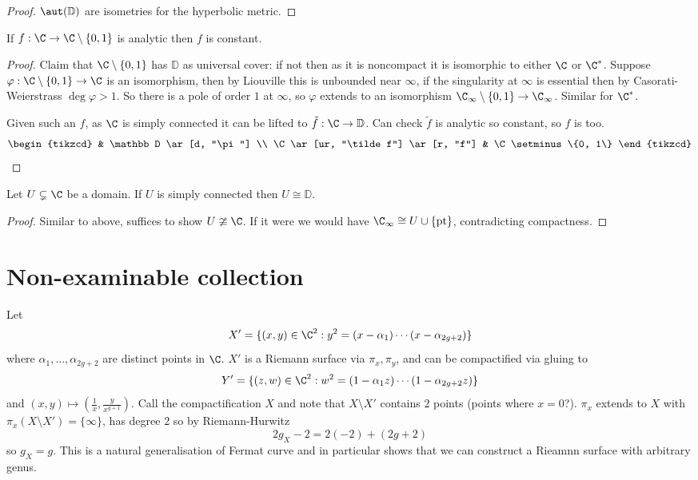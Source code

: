 \documentclass[a4paper]{article}
\begin{document}
\begin{proof}
  \(\aut(\mathbb D)\) are isometries for the hyperbolic metric.
\end{proof}

\begin{corollary}[Picard]
  If \(f: \C \to \C \setminus \{0, 1\}\) is analytic then \(f\) is constant.
\end{corollary}

\begin{proof}
  Claim that \(\C \setminus \{0, 1\}\) has \(\mathbb D\) as universal cover: if not then as it is noncompact it is isomorphic to either \(\C\) or \(\C^*\). Suppose \(\varphi: \C \setminus \{0, 1\} \to \C\) is an isomorphism, then by Liouville this is unbounded near \(\infty\), if the singularity at \(\infty\) is essential then by Casorati-Weierstrass \(\deg \varphi > 1\). So there is a pole of order \(1\) at \(\infty\), so \(\varphi\) extends to an isomorphism \(\C_\infty \setminus \{0, 1\} \to \C_\infty\). Similar for \(\C^*\).
  
  Given such an \(f\), as \(\C\) is simply connected it can be lifted to \(\tilde f: \C \to \mathbb D\). Can check \(\tilde f\) is analytic so constant, so \(f\) is too.
  \[
    \begin{tikzcd}
      & \mathbb D \ar[d, "\pi"] \\
      \C \ar[ur, "\tilde f"] \ar[r, "f"] & \C \setminus \{0, 1\}
    \end{tikzcd}
  \]
\end{proof}

\begin{corollary}
  Let \(U \subsetneq \C\) be a domain. If \(U\) is simply connected then \(U \cong \mathbb D\).
\end{corollary}

\begin{proof}
  Similar to above, suffices to show \(U \ncong \C\). If it were we would have \(\C_\infty \cong U \cup \{\text{pt}\}\), contradicting compactness.
\end{proof}

\section{Non-examinable collection}

Let
\[
  X' = \{(x, y) \in \C^2: y^2 = (x - \alpha_1) \cdots (x - \alpha_{2g + 2})\}
\]
where \(\alpha_1, \dots, \alpha_{2g + 2}\) are distinct points in \(\C\). \(X'\) is a Riemann surface via \(\pi_x, \pi_y\), and can be compactified via gluing to
\[
  Y' = \{(z, w) \in \C^2: w^2 = (1 - \alpha_1z) \cdots (1 - \alpha_{2g + 2} z)\}
\]
and \((x, y) \mapsto (\frac{1}{x}, \frac{y}{x^{g + 1}})\). Call the compactification \(X\) and note that \(X \setminus X'\) contains 2 points (points where \(x = 0\)?). \(\pi_x\) extends to \(X\) with \(\pi_x(X \setminus X') = \{\infty\}\), has degree \(2\) so by Riemann-Hurwitz
\[
  2g_X - 2 = 2(-2) + (2g + 2)
\]
so \(g_X = g\). This is a natural generalisation of Fermat curve and in particular shows that we can construct a Rieamnn surface with arbitrary genus.
\end{document}
